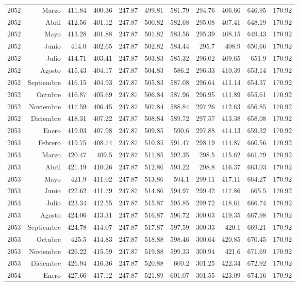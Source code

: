 \documentclass{article}%
\begin{document}
\begin{longtable}{|l r|r|r|r|r|r|r|r|r|r|}
2052&Marzo&411.84&400.36&247.87&499.81&581.79&294.76&406.66&646.95&170.92\\%
2052&Abril&412.56&401.12&247.87&500.82&582.68&295.08&407.41&648.19&170.92\\%
2052&Mayo&413.28&401.88&247.87&501.82&583.56&295.39&408.15&649.43&170.92\\%
2052&Junio&414.0&402.65&247.87&502.82&584.44&295.7&408.9&650.66&170.92\\%
2052&Julio&414.71&403.41&247.87&503.83&585.32&296.02&409.65&651.9&170.92\\%
2052&Agosto&415.43&404.17&247.87&504.83&586.2&296.33&410.39&653.14&170.92\\%
2052&Septiembre&416.15&404.93&247.87&505.83&587.08&296.64&411.14&654.37&170.92\\%
2052&Octubre&416.87&405.69&247.87&506.84&587.96&296.95&411.89&655.61&170.92\\%
2052&Noviembre&417.59&406.45&247.87&507.84&588.84&297.26&412.63&656.85&170.92\\%
2052&Diciembre&418.31&407.22&247.87&508.84&589.72&297.57&413.38&658.08&170.92\\%
2053&Enero&419.03&407.98&247.87&509.85&590.6&297.88&414.13&659.32&170.92\\%
2053&Febrero&419.75&408.74&247.87&510.85&591.47&298.19&414.87&660.56&170.92\\%
2053&Marzo&420.47&409.5&247.87&511.85&592.35&298.5&415.62&661.79&170.92\\%
2053&Abril&421.19&410.26&247.87&512.86&593.22&298.8&416.37&663.03&170.92\\%
2053&Mayo&421.9&411.02&247.87&513.86&594.1&299.11&417.11&664.27&170.92\\%
2053&Junio&422.62&411.79&247.87&514.86&594.97&299.42&417.86&665.5&170.92\\%
2053&Julio&423.34&412.55&247.87&515.87&595.85&299.72&418.61&666.74&170.92\\%
2053&Agosto&424.06&413.31&247.87&516.87&596.72&300.03&419.35&667.98&170.92\\%
2053&Septiembre&424.78&414.07&247.87&517.87&597.59&300.33&420.1&669.21&170.92\\%
2053&Octubre&425.5&414.83&247.87&518.88&598.46&300.64&420.85&670.45&170.92\\%
2053&Noviembre&426.22&415.59&247.87&519.88&599.33&300.94&421.6&671.69&170.92\\%
2053&Diciembre&426.94&416.36&247.87&520.88&600.2&301.25&422.34&672.92&170.92\\%
2054&Enero&427.66&417.12&247.87&521.89&601.07&301.55&423.09&674.16&170.92\\%

\end{longtable}
\end{document}

